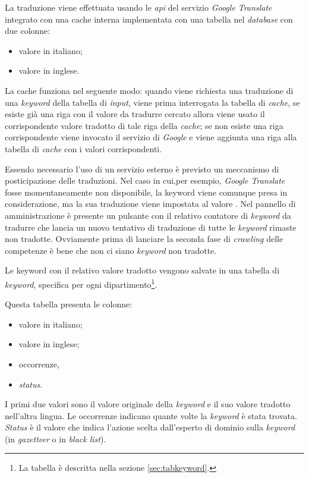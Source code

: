 \documentclass[tesi.tex]{subfiles}
\begin{document}
    La traduzione viene effettuata usando le \emph{api} del servizio
    \emph{Google Translate} integrato con una cache interna implementata
    con una tabella nel \emph{database} con due colonne:
    \begin{itemize}
    \item valore in italiano;
    \item valore in inglese.
    \end{itemize}
    La cache funziona nel seguente modo: quando viene richiesta una
    traduzione di una \emph{keyword} della tabella di \emph{input},
    viene prima interrogata la tabella di \emph{cache}, se esiste
    gi\`a una riga con il valore da tradurre cercato allora viene
    usato il corrispondente valore tradotto di tale riga della
    \emph{cache}; se non esiste una riga corrispondente viene invocato
    il servizio di \emph{Google} e viene aggiunta una riga alla
    tabella di \emph{cache} con i valori corrispondenti.

    Essendo necessario l'uso di un servizio esterno \`e previsto un
    meccanismo di posticipazione delle traduzioni. Nel caso in cui,per esempio, \emph{Google Translate}
    fosse momentaneamente non disponibile, la keyword viene comunque
    presa in considerazione, ma la sua traduzione viene impostata al
    valore . Nel pannello di amministrazione
    \`e presente un pulsante con il relativo contatore di
    \emph{keyword} da tradurre che lancia un nuovo tentativo di
    traduzione di tutte le \emph{keyword} rimaste non
    tradotte. Ovviamente prima di lanciare la seconda fase di
    \emph{crawling} delle competenze \`e bene che non ci siano
    \emph{keyword} non tradotte.

    Le keyword con il relativo valore tradotto vengono salvate in una
    tabella di \emph{keyword}, specifica per ogni
    dipartimento\footnote{La tabella \`e descritta nella
      sezione \ref{sec:tabkeyword}.}.

    Questa tabella presenta le colonne:
    \begin{itemize}
    \item valore in italiano;
    \item valore in inglese;
    \item occorrenze,
    \item \emph{status}.
    \end{itemize}
    I primi due valori sono il valore originale della
    \emph{keyword} e il suo valore tradotto nell'altra lingua. Le
    occorrenze indicano quante volte la \emph{keyword} \`e stata
    trovata. \emph{Status} \`e il valore che indica l'azione scelta
    dall'esperto di dominio sulla \emph{keyword} (in \emph{gazetteer}
    o in \emph{black list}).
\end{document}
